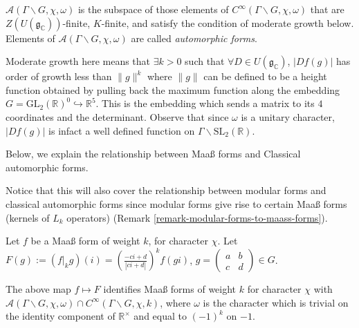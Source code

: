 \begin{definition}
\label{definition-classical-automorphic-forms}
	$\mathcal{A}(\Gamma \backslash G, \chi, \omega)$ is the subspace of those elements of $C^{\infty}(\Gamma \backslash G, \chi, \omega)$ that are $Z(U(\mathfrak{g}_\mathbb{C}))$-finite, $K$-finite, and satisfy the condition of moderate growth below. Elements of $\mathcal{A}(\Gamma \backslash G, \chi, \omega)$ are called \textit{automorphic forms}.
	
	Moderate growth here means that $\exists k > 0$ such that $\forall D \in U(\mathfrak{g}_\mathbb{C})$, $|Df(g)|$ has order of growth less than $\lVert g \rVert^{k}$ where $\lVert g \rVert$ can be defined to be a height function obtained by pulling back the maximum function along the embedding $G = \text{GL}_2({\mathbb{R}})^0 \hookrightarrow \mathbb{R}^{5}$. This is the embedding which sends a matrix to its $4$ coordinates and the determinant. Observe that since $\omega$ is a unitary character,  $|Df(g)|$ is infact a well defined function on $\Gamma\backslash \text{SL}_2(\mathbb{R})$. 
\end{definition} 



Below, we explain the relationship between Maa{\ss} forms and Classical automorphic forms.
\begin{remark}
\label{remark-also-holomorphic}
	Notice that this will also cover the relationship between modular forms and classical automorphic forms since modular forms give rise to certain Maa{\ss} forms (kernels of $L_k$ operators) (Remark \ref{remark-modular-forms-to-maass-forms}).
\end{remark}

Let $f$ be a Maa{\ss} form of weight $k$, for character $\chi$. Let $F(g) := (f|_k g)(i) = \left(\frac{-ci + d}{|ci + d|}\right)^{k} f(gi)$, $g = \begin{pmatrix}  a & b \\ c& d \end{pmatrix} \in G$.

\begin{proposition}
\label{proposition-Maass-automorphic}
	The above map $f \mapsto F$ identifies Maa{\ss} forms of weight $k$ for character $\chi$ with $\mathcal{A}(\Gamma \backslash G, \chi, \omega) \cap C^{\infty}(\Gamma \backslash G, \chi, k)$, where $\omega$ is the character which is trivial on the identity component of $\mathbb{R}^{\times}$ and equal to $(-1)^{k}$ on $-1$.
\end{proposition}

